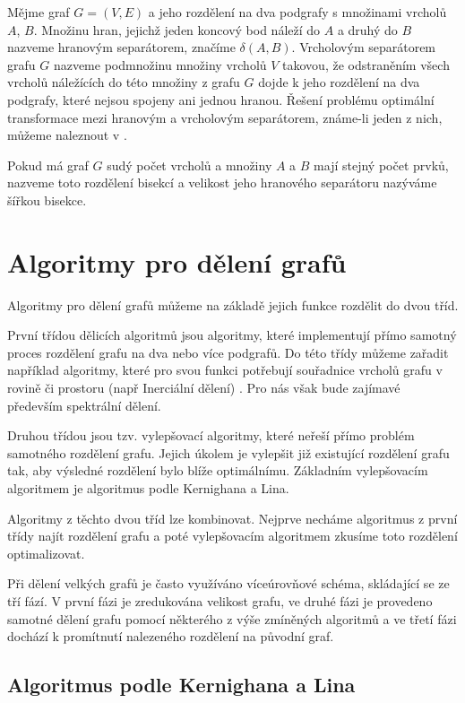 \documentclass[11pt,american,czech,oneside]{book}
\theoremstyle{plain}
\theoremstyle{definition}
\begin{document}
Mějme graf $G=(V,E)$ a jeho rozdělení na dva podgrafy s množinami vrcholů $A$, $B$. Množinu hran, jejichž jeden koncový bod náleží do $A$ a druhý do $B$ nazveme hranovým separátorem, značíme $\delta(A,B)$. Vrcholovým separátorem grafu $G$ nazveme podmnožinu množiny vrcholů $V$ takovou, že odstraněním všech vrcholů náležících do této množiny z grafu $G$ dojde k jeho rozdělení na dva podgrafy, které nejsou spojeny ani jednou hranou. Řešení problému optimální transformace mezi hranovým a vrcholovým separátorem, známe-li jeden z nich, můžeme naleznout v \cite{pofa:90}.

Pokud má graf $G$ sudý počet vrcholů a množiny $A$ a $B$ mají stejný počet prvků, nazveme toto rozdělení bisekcí a velikost jeho hranového separátoru nazýváme šířkou bisekce.

\section{Algoritmy pro dělení grafů}
Algoritmy pro dělení grafů můžeme na základě jejich funkce rozdělit do dvou tříd.

První třídou dělicích algoritmů jsou algoritmy, které implementují přímo samotný proces rozdělení grafu na dva nebo více podgrafů. Do této třídy můžeme zařadit například algoritmy, které pro svou funkci potřebují souřadnice vrcholů grafu v rovině či prostoru (např Inerciální dělení) \cite{poth:97}. Pro nás však bude zajímavé především spektrální dělení.

Druhou třídou jsou tzv. vylepšovací algoritmy, které neřeší přímo problém samotného rozdělení grafu. Jejich úkolem je vylepšit již existující rozdělení grafu tak, aby výsledné rozdělení bylo blíže optimálnímu. Základním vylepšovacím algoritmem je algoritmus podle Kernighana a Lina.

Algoritmy z těchto dvou tříd lze kombinovat. Nejprve necháme algoritmus z první třídy najít rozdělení grafu a poté vylepšovacím algoritmem zkusíme toto rozdělení optimalizovat.

Při dělení velkých grafů je často využíváno víceúrovňové schéma, skládající se ze tří fází. V první fázi je zredukována velikost grafu, ve druhé fázi je provedeno samotné dělení grafu pomocí některého z výše zmíněných algoritmů a ve třetí fázi dochází k promítnutí nalezeného rozdělení na původní graf.

\subsection{Algoritmus podle Kernighana a Lina}
\end{document}
